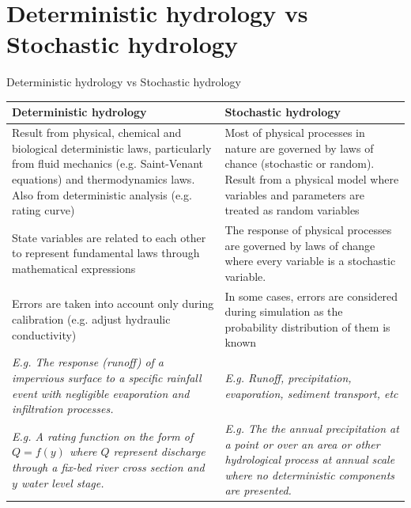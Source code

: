 \documentclass[8pt]{beamer}
\begin{document}
\section{Deterministic hydrology vs Stochastic hydrology}
\begin{frame}{Deterministic hydrology vs Stochastic hydrology}
    
    \begin{tabular}{p{5.5cm}p{5.5cm}}  %
    \hline
    \alert{Deterministic hydrology} & \alert{Stochastic hydrology} \\
    \hline
    Result from physical, chemical and biological deterministic laws, particularly from fluid mechanics (e.g. Saint-Venant equations) and thermodynamics laws. Also from deterministic analysis (e.g. rating curve) & Most of physical processes in nature are governed by laws of chance (stochastic or random). Result from a physical model where variables and parameters are treated as random variables \\ \hline
    State variables are related to each other to represent fundamental laws through mathematical expressions & The response of physical processes are governed by laws of change where every variable is a stochastic variable. \\\hline
    Errors are taken into account only during calibration (e.g. adjust hydraulic conductivity) & In some cases, errors are considered during simulation as the \alert{probability distribution} of them is known \\ \hline
    \emph{E.g. The response (runoff) of a impervious surface to a specific rainfall event with negligible evaporation and infiltration processes.} & \emph{E.g. Runoff, precipitation, evaporation, sediment transport, etc} \\\hline
    \emph{E.g. A rating function on the form of $Q = f(y)$ where $Q$ represent discharge through a fix-bed river cross section and $y$ water level stage.} &  \emph{E.g. The the annual precipitation at a point or over an area or other hydrological process at annual scale where no deterministic components are presented.}\\ \hline
    \end{tabular}
\end{frame}
\end{document}
